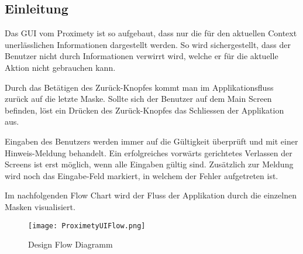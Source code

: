 \subsection{Einleitung}
Das GUI vom Proximety ist so aufgebaut, dass nur die für den aktuellen Context unerlässlichen Informationen dargestellt werden. So wird sichergestellt, dass der Benutzer nicht durch Informationen verwirrt wird, welche er für die aktuelle Aktion nicht gebrauchen kann.

Durch das Betätigen des Zurück-Knopfes kommt man im Applikationsfluss zurück auf die letzte Maske. Sollte sich der Benutzer auf dem Main Screen befinden, löst ein Drücken des Zurück-Knopfes das Schliessen der Applikation aus. 

Eingaben des Benutzers werden immer auf die Gültigkeit überprüft und mit einer Hinweis-Meldung behandelt. Ein erfolgreiches vorwärts gerichtetes Verlassen der Screens ist erst möglich, wenn alle Eingaben gültig sind. Zusätzlich zur Meldung wird noch das Eingabe-Feld markiert, in welchem der Fehler aufgetreten ist.

Im nachfolgenden Flow Chart wird der Fluss der Applikation durch die einzelnen Masken visualisiert.

\begin{figure}[hp]
	\centering
		\texttt{[image: ProximetyUIFlow.png]}
	\caption{Design Flow Diagramm}
	\label{fig:ProximetyUIFlow}
\end{figure}
\FloatBarrier